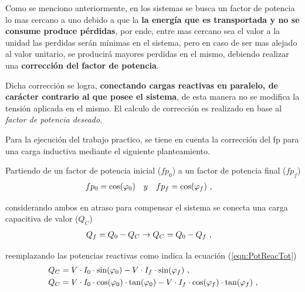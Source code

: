                Como se menciono anteriormente, en los sistemas se busca un factor de potencia 
               lo mas cercano a uno debido a que la \textbf{la energía que es transportada 
               y no se consume produce pérdidas}, por ende, entre mas cercano sea el valor a 
               la unidad las perdidas serán mínimas en el sistema, pero en caso de ser mas alejado 
               al valor unitario, se producirá mayores perdidas en el mismo, debiendo realizar
               una \textbf{corrección del factor de potencia}.

               Dicha corrección se logra, \textbf{conectando cargas reactivas en paralelo, 
               de carácter contrario al que posee el sistema}, de esta manera no se modifica 
               la tensión aplicada en el mismo. El calculo de corrección es realizado en base 
               al \textit{factor de potencia deseado}.
               
               Para la ejecución del trabajo practico, se tiene en cuenta la corrección del 
               fp para una carga inductiva mediante el siguiente planteamiento.

               Partiendo de un factor de potencia inicial (\(fp_0\)) a un factor 
               de potencia final (\(fp_f\))
               \begin{align}
                  fp_0  &= \cos(\varphi_0) \hspace{10pt} y \hspace{10pt} fp_f = \cos(\varphi_f) \ , \notag
               \end{align}

               \noindent considerando ambos en atraso para compensar el sistema se 
               conecta una carga capacitiva de valor (\(Q_C\))
               \begin{align}  
                  Q_f   &= Q_0 - Q_C \rightarrow Q_C = Q_0 - Q_f  \ , \notag
               \end{align}

               \noindent reemplazando las potencias reactivas como indica la ecuación (\ref{eqn:PotReacTot}) 
               \begin{align}   
                  Q_C   &= V\cdot I_0\cdot \sin(\varphi_0) - V\cdot I_f\cdot \sin(\varphi_f) \ , \notag \\ 
                  Q_C   &= V\cdot I_0\cdot \cos(\varphi_0)\cdot \tan(\varphi_0)  - V\cdot I_f\cdot \cos(\varphi_f)\cdot \tan(\varphi_f) \ , \notag
               \end{align}   


